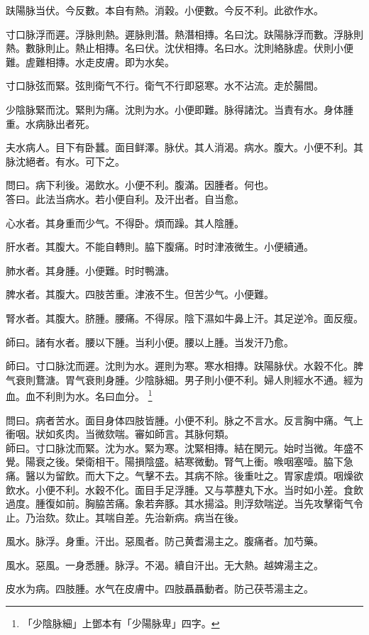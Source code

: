 趺陽脉当伏。今反數。本自有熱。消穀。小便數。今反不利。此欲作水。

寸口脉浮而遲。浮脉則熱。遲脉則潛。熱潛相摶。名曰沈。趺陽脉浮而數。浮脉則熱。數脉則止。熱止相摶。名曰伏。沈伏相摶。名曰水。沈則絡脉虗。伏則小便難。虗難相摶。水走皮膚。即为水矣。

寸口脉弦而緊。弦則衛气不行。衛气不行即惡寒。水不沾流。走於腸間。

少陰脉緊而沈。緊則为痛。沈則为水。小便即難。脉得諸沈。当責有水。身体腫重。水病脉出者死。

夫水病人。目下有卧蠶。面目鲜澤。脉伏。其人消渴。病水。腹大。小便不利。其脉沈絕者。有水。可下之。

問曰。病下利後。渴飲水。小便不利。腹滿。因腫者。何也。\\
答曰。此法当病水。若小便自利。及汗出者。自当愈。

心水者。其身重而少气。不得卧。煩而躁。其人陰腫。

肝水者。其腹大。不能自轉則。脇下腹痛。时时津液微生。小便續通。

肺水者。其身腫。小便難。时时鴨溏。

脾水者。其腹大。四肢苦重。津液不生。但苦少气。小便難。

腎水者。其腹大。脐腫。腰痛。不得尿。陰下濕如牛鼻上汗。其足逆冷。面反瘦。

師曰。諸有水者。腰以下腫。当利小便。腰以上腫。当发汗乃愈。

師曰。寸口脉沈而遲。沈則为水。遲則为寒。寒水相摶。趺陽脉伏。水穀不化。脾气衰則鶩溏。胃气衰則身腫。少陰脉細。男子則小便不利。婦人則經水不通。經为血。血不利則为水。名曰血分。
	\footnote{
		「少陰脉細」上鄧本有「少陽脉卑」四字。
	}

問曰。病者苦水。面目身体四肢皆腫。小便不利。脉之不言水。反言胸中痛。气上衝咽。狀如炙肉。当微欬喘。審如師言。其脉何類。\\
師曰。寸口脉沈而緊。沈为水。緊为寒。沈緊相摶。結在関元。始时当微。年盛不覺。陽衰之後。榮衛相干。陽損陰盛。結寒微動。腎气上衝。㗋咽塞噎。脇下急痛。醫以为留飲。而大下之。气擊不去。其病不除。後重吐之。胃家虗煩。咽燥欲飲水。小便不利。水穀不化。面目手足浮腫。又与葶藶丸下水。当时如小差。食飲過度。腫復如前。胸脇苦痛。象若奔豚。其水揚溢。則浮欬喘逆。当先攻擊衛气令止。乃治欬。欬止。其喘自差。先治新病。病当在後。

風水。脉浮。身重。汗出。惡風者。防己黄耆湯主之。腹痛者。加芍藥。

風水。惡風。一身悉腫。脉浮。不渴。續自汗出。无大熱。越婢湯主之。

皮水为病。四肢腫。水气在皮膚中。四肢聶聶動者。防己茯苓湯主之。

